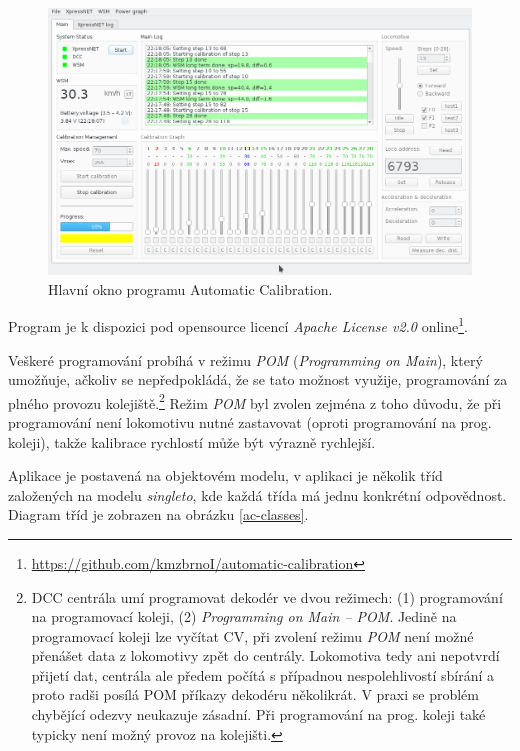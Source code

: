 \begin{figure}[h]
\includegraphics[width=\textwidth]{data/ac_progress.png}
\caption{Hlavní okno programu Automatic Calibration.}
\label{fig:ac-gui}
\end{figure}

Program je k dispozici pod opensource licencí \textit{Apache License v2.0}
online\footnote{\url{https://github.com/kmzbrnoI/automatic-calibration}}.

Veškeré programování probíhá v režimu \textit{POM} (\textit{Programming on
Main}), který umožňuje, ačkoliv se nepředpokládá, že se tato možnost využije,
programování za plného provozu kolejiště.\footnote{DCC centrála umí programovat
dekodér ve dvou režimech: (1) programování na programovací koleji, (2)
\textit{Programming on Main -- POM}. Jedině na programovací koleji lze vyčítat
CV, při zvolení režimu \textit{POM} není možné přenášet data z lokomotivy zpět
do centrály.  Lokomotiva tedy ani nepotvrdí přijetí dat, centrála ale předem
počítá s případnou nespolehlivostí sbírání a proto radši posílá POM příkazy
dekodéru několikrát.  V praxi se problém chybějící odezvy neukazuje zásadní.
Při programování na prog.  koleji také typicky není možný provoz na kolejišti.}
Režim \textit{POM} byl zvolen zejména z toho důvodu, že při programování není
lokomotivu nutné zastavovat (oproti programování na prog. koleji), takže
kalibrace rychlostí může být výrazně rychlejší.

Aplikace je postavená na objektovém modelu, v aplikaci je několik tříd
založených na modelu \textit{singleto}, kde každá třída má jednu konkrétní
odpovědnost. Diagram tříd je zobrazen na obrázku
\ref{ac-classes}.


